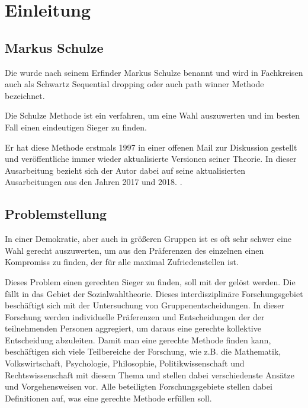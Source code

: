 \section{Einleitung}
\label{sec:Einleitung}


\subsection{Markus Schulze} 
\label{sec:markusSchulze}
Die \schulze wurde nach seinem Erfinder Markus Schulze benannt und wird in Fachkreisen auch als \glqq Schwartz Sequential dropping\grqq{} oder auch \glqq path winner\grqq{} Methode bezeichnet.

Die Schulze Methode ist ein verfahren, um eine Wahl auszuwerten und im besten Fall einen eindeutigen Sieger zu finden.

Er hat diese Methode erstmals 1997 in einer offenen Mail zur Diskussion gestellt \citep{Schulze1997} und veröffentliche immer wieder aktualisierte Versionen seiner Theorie. In dieser Ausarbeitung bezieht sich der Autor dabei auf seine aktualisierten Ausarbeitungen aus den Jahren 2017 und 2018.\citep{Schulze2017, Schulze2018} .

\subsection{Problemstellung} 
\label{sec:problemstellung}
In einer Demokratie, aber auch in größeren Gruppen ist es oft sehr schwer eine Wahl gerecht auszuwerten, um aus den Präferenzen des einzelnen einen Kompromiss zu finden, der für alle maximal Zufriedenstellen ist.

Dieses Problem einen gerechten Sieger zu finden, soll mit der \schulze gelöst werden. Die \schulze fällt in das Gebiet der Sozialwahltheorie. Dieses interdisziplinäre Forschungsgebiet beschäftigt sich mit der Untersuchung von Gruppenentscheidungen. In dieser Forschung werden individuelle Präferenzen und Entscheidungen der der teilnehmenden Personen aggregiert, um daraus eine \glqq gerechte\grqq{} kollektive Entscheidung abzuleiten. Damit man eine \glqq gerechte\grqq{} Methode finden kann, beschäftigen sich viele Teilbereiche der Forschung, wie z.B. die Mathematik, Volkswirtschaft, Psychologie, Philosophie, Politikwissenschaft und Rechtswissenschaft mit diesem Thema und stellen dabei verschiedenste Ansätze und Vorgehensweisen vor. Alle beteiligten Forschungsgebiete stellen dabei Definitionen auf, was eine \glqq gerechte\grqq{} Methode erfüllen soll. \citep{scheubrein2013computerunterstuetzte}

